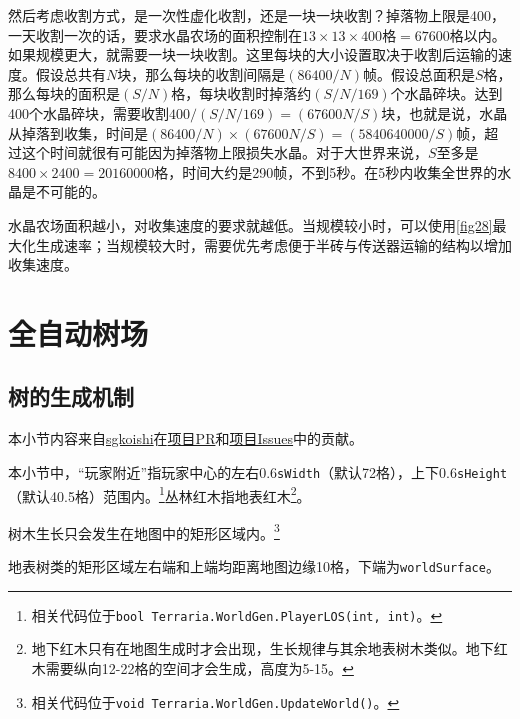 然后考虑收割方式，是一次性虚化收割，还是一块一块收割？掉落物上限是400，一天收割一次的话，要求水晶农场的面积控制在$13\times 13\times 400\textrm{格}=67600$格以内。如果规模更大，就需要一块一块收割。这里每块的大小设置取决于收割后运输的速度。假设总共有$N$块，那么每块的收割间隔是$(86400/N)$帧。假设总面积是$S$格，那么每块的面积是$(S/N)$格，每块收割时掉落约$(S/N/169)$个水晶碎块。达到400个水晶碎块，需要收割$400/(S/N/169)=(67600N/S)$块，也就是说，水晶从掉落到收集，时间是$(86400/N)\times(67600N/S)=(5840640000/S)$帧，超过这个时间就很有可能因为掉落物上限损失水晶。对于大世界来说，$S$至多是$8400\times2400=20160000$格，时间大约是290帧，不到5秒。在5秒内收集全世界的水晶是不可能的。

水晶农场面积越小，对收集速度的要求就越低。当规模较小时，可以使用\autoref{fig28}最大化生成速率；当规模较大时，需要优先考虑便于半砖与传送器运输的结构以增加收集速度。

\section{全自动树场}
\subsection{树的生成机制}\label{sec19}
\begin{note}
本小节内容来自\href{https://github.com/sgkoishi}{sgkoishi}在\href{https://github.com/putianyi889/TerrariaWiringTutorial/pull/16}{项目PR}和\href{https://github.com/putianyi889/TerrariaWiringTutorial/issues/10#issuecomment-548415208}{项目Issues}中的贡献。
\end{note}
本小节中，“玩家附近”指玩家中心的左右0.6\lstinline{sWidth}（默认72格），上下0.6\lstinline{sHeight}（默认40.5格）范围内。\footnote{相关代码位于\lstinline{bool Terraria.WorldGen.PlayerLOS(int, int)}。}丛林红木指地表红木\footnote{地下红木只有在地图生成时才会出现，生长规律与其余地表树木类似。地下红木需要纵向12-22格的空间才会生成，高度为5-15。}。

树木生长只会发生在地图中的矩形区域内。\footnote{相关代码位于\lstinline{void Terraria.WorldGen.UpdateWorld()}。}

地表树类的矩形区域左右端和上端均距离地图边缘10格，下端为\lstinline{worldSurface}。

